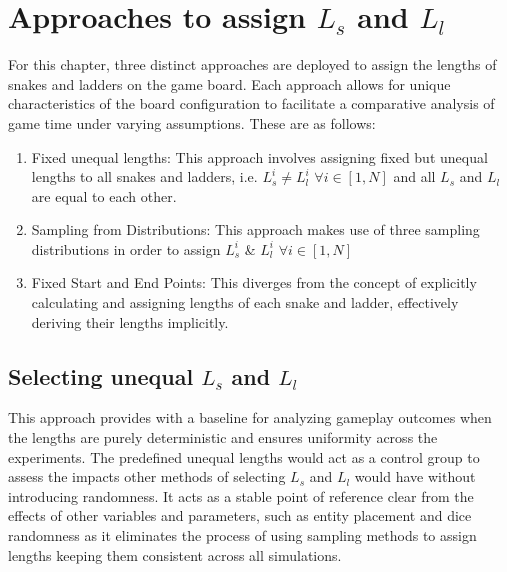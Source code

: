 \documentclass[12pt]{report}
\begin{document}
	\section{Approaches to assign $L_s$ and $L_l$}
	For this chapter, three distinct approaches are deployed to assign the lengths of snakes and ladders on the game board. Each approach allows for unique characteristics of the board configuration to facilitate a comparative analysis of game time under varying assumptions. These are as follows:
	\begin{enumerate}
		\item Fixed unequal lengths: This approach involves assigning fixed but unequal lengths to all snakes and ladders, i.e. $L^i_s \neq  L^i_l$ \space $ \forall i \in [1, N]$ and all $L_s$  and $L_l$ are equal to each other.
		\item Sampling from Distributions: This approach makes use of three sampling distributions in order to assign $L^i_s$ \&  $L^i_l$ \space $\forall i \in [1, N]$
		\item Fixed Start and End Points: This diverges from the concept of explicitly calculating and assigning lengths of each snake and ladder, effectively deriving their lengths implicitly.
	\end{enumerate}
	
	\subsection{Selecting unequal $L_s$ and $L_l$}
	This approach provides with a baseline for analyzing gameplay outcomes when the lengths are purely deterministic and ensures uniformity across the experiments. The predefined unequal lengths would act as a control group to assess the impacts other methods of selecting $L_s$ and $L_l$ would have without introducing randomness. It acts as a stable point of reference clear from the effects of other variables and parameters, such as entity placement and dice randomness as it eliminates the process of using sampling methods to assign lengths keeping them consistent across all simulations.
	
\end{document}
